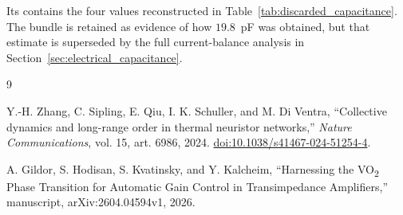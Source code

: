\documentclass[11pt]{article}
\newcommand{\vo}{VO\textsubscript{2}}
\begin{document}
Its  contains the four values reconstructed in Table~\ref{tab:discarded_capacitance}. The bundle is retained as evidence of how $19.8$~pF was obtained, but that estimate is superseded by the full current-balance analysis in Section~\ref{sec:electrical_capacitance}.

\begin{thebibliography}{9}

Y.-H. Zhang, C. Sipling, E. Qiu, I. K. Schuller, and M. Di Ventra,
``Collective dynamics and long-range order in thermal neuristor networks,''
\emph{Nature Communications}, vol. 15, art. 6986, 2024.
\href{https://doi.org/10.1038/s41467-024-51254-4}{doi:10.1038/s41467-024-51254-4}.

A. Gildor, S. Hodisan, S. Kvatinsky, and Y. Kalcheim,
``Harnessing the \vo{} Phase Transition for Automatic Gain Control in Transimpedance Amplifiers,''
manuscript, arXiv:2604.04594v1, 2026.

\end{thebibliography}
\end{document}
